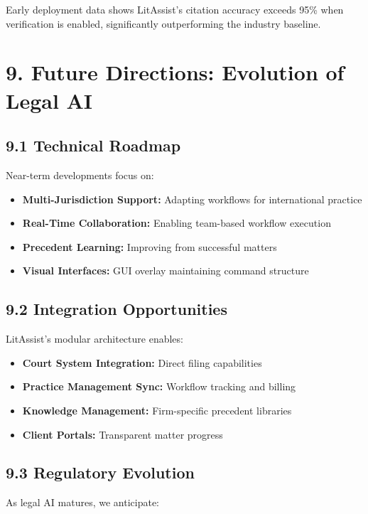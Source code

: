 \documentclass[12pt,a4paper]{article}
\begin{document}
Early deployment data shows LitAssist's citation accuracy exceeds 95\% when verification is enabled, significantly outperforming the industry baseline.

\section*{9. Future Directions: Evolution of Legal AI}

\subsection*{9.1 Technical Roadmap}

Near-term developments focus on:

\begin{itemize}
\item \textbf{Multi-Jurisdiction Support:} Adapting workflows for international practice
\item \textbf{Real-Time Collaboration:} Enabling team-based workflow execution
\item \textbf{Precedent Learning:} Improving from successful matters
\item \textbf{Visual Interfaces:} GUI overlay maintaining command structure
\end{itemize}

\subsection*{9.2 Integration Opportunities}

LitAssist's modular architecture enables:

\begin{itemize}
\item \textbf{Court System Integration:} Direct filing capabilities
\item \textbf{Practice Management Sync:} Workflow tracking and billing
\item \textbf{Knowledge Management:} Firm-specific precedent libraries
\item \textbf{Client Portals:} Transparent matter progress
\end{itemize}

\subsection*{9.3 Regulatory Evolution}

As legal AI matures, we anticipate:
\end{document}
